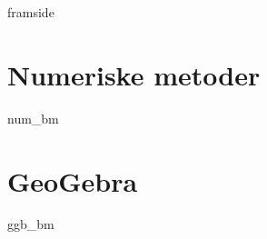 





\addto\captionsenglish{\renewcommand{\contentsname}{Innhold}}


	
	{framside}
	
	{\footnotesize \tableofcontents}
	\newpage
	
	
	\chapter{Numeriske metoder}
	\newpage
	{num_bm}
	
	\chapter{GeoGebra}
	\newpage
	{ggb_bm}
	
	
	


	
	


